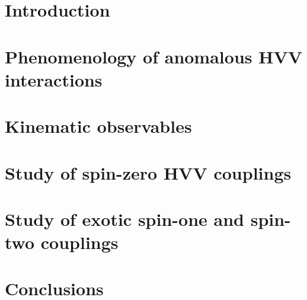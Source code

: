 \documentclass[3p,times,twocolumn]{elsarticle}
\begin{document}

\section{Introduction}
\label{sec:introduction}


\section{Phenomenology of anomalous HVV interactions}
\label{sec:phenomenology}


\section{Kinematic observables}
\label{sec:observables}

\section{Study of spin-zero HVV couplings}
\label{sec:spinzero}

\section{Study of exotic spin-one and spin-two couplings}
\label{sec:spinzero}

\section{Conclusions}
\label{sec:conclusions}




\nocite{*}



%






\end{document}
